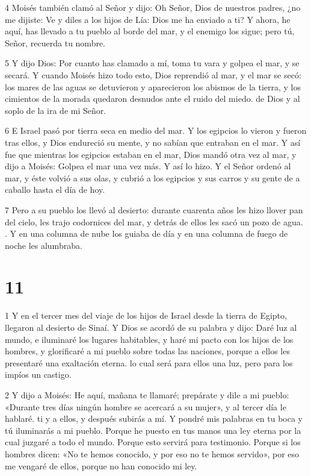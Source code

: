 \par 4 Moisés también clamó al Señor y dijo: Oh Señor, Dios de nuestros padres, ¿no me dijiste: Ve y diles a los hijos de Lía: Dios me ha enviado a ti? Y ahora, he aquí, has llevado a tu pueblo al borde del mar, y el enemigo los sigue; pero tú, Señor, recuerda tu nombre.

\par 5 Y dijo Dios: Por cuanto has clamado a mí, toma tu vara y golpea el mar, y se secará. Y cuando Moisés hizo todo esto, Dios reprendió al mar, y el mar se secó: los mares de las aguas se detuvieron y aparecieron los abismos de la tierra, y los cimientos de la morada quedaron desnudos ante el ruido del miedo. de Dios y al soplo de la ira de mi Señor.

\par 6 E Israel pasó por tierra seca en medio del mar. Y los egipcios lo vieron y fueron tras ellos, y Dios endureció su mente, y no sabían que entraban en el mar. Y así fue que mientras los egipcios estaban en el mar, Dios mandó otra vez al mar, y dijo a Moisés: Golpea el mar una vez más. Y así lo hizo. Y el Señor ordenó al mar, y éste volvió a sus olas, y cubrió a los egipcios y sus carros y su gente de a caballo hasta el día de hoy.

\par 7 Pero a su pueblo los llevó al desierto: durante cuarenta años les hizo llover pan del cielo, les trajo codornices del mar, y detrás de ellos les sacó un pozo de agua. . Y en una columna de nube los guiaba de día y en una columna de fuego de noche les alumbraba.

\chapter{11}

\par 1 Y en el tercer mes del viaje de los hijos de Israel desde la tierra de Egipto, llegaron al desierto de Sinaí. Y Dios se acordó de su palabra y dijo: Daré luz al mundo, e iluminaré los lugares habitables, y haré mi pacto con los hijos de los hombres, y glorificaré a mi pueblo sobre todas las naciones, porque a ellos les presentaré una exaltación eterna. lo cual será para ellos una luz, pero para los impíos un castigo.

\par 2 Y dijo a Moisés: He aquí, mañana te llamaré; prepárate y dile a mi pueblo: «Durante tres días ningún hombre se acercará a su mujer», y al tercer día le hablaré. ti y a ellos, y después subirás a mí. Y pondré mis palabras en tu boca y tú iluminarás a mi pueblo. Porque he puesto en tus manos una ley eterna por la cual juzgaré a todo el mundo. Porque esto servirá para testimonio. Porque si los hombres dicen: «No te hemos conocido, y por eso no te hemos servido», por eso me vengaré de ellos, porque no han conocido mi ley.

